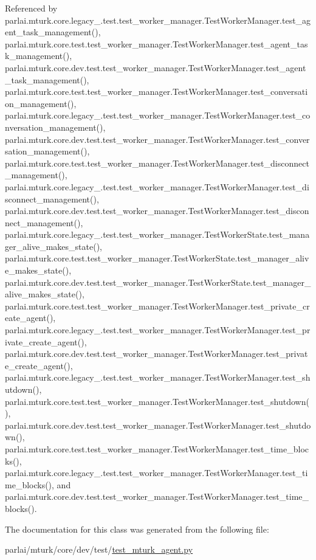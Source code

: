 Referenced by parlai.\+mturk.\+core.\+legacy\+\_.\+test.\+test\+\_\+worker\+\_\+manager.\+Test\+Worker\+Manager.\+test\+\_\+agent\+\_\+task\+\_\+management(), parlai.\+mturk.\+core.\+test.\+test\+\_\+worker\+\_\+manager.\+Test\+Worker\+Manager.\+test\+\_\+agent\+\_\+task\+\_\+management(), parlai.\+mturk.\+core.\+dev.\+test.\+test\+\_\+worker\+\_\+manager.\+Test\+Worker\+Manager.\+test\+\_\+agent\+\_\+task\+\_\+management(), parlai.\+mturk.\+core.\+test.\+test\+\_\+worker\+\_\+manager.\+Test\+Worker\+Manager.\+test\+\_\+conversation\+\_\+management(), parlai.\+mturk.\+core.\+legacy\+\_.\+test.\+test\+\_\+worker\+\_\+manager.\+Test\+Worker\+Manager.\+test\+\_\+conversation\+\_\+management(), parlai.\+mturk.\+core.\+dev.\+test.\+test\+\_\+worker\+\_\+manager.\+Test\+Worker\+Manager.\+test\+\_\+conversation\+\_\+management(), parlai.\+mturk.\+core.\+test.\+test\+\_\+worker\+\_\+manager.\+Test\+Worker\+Manager.\+test\+\_\+disconnect\+\_\+management(), parlai.\+mturk.\+core.\+legacy\+\_.\+test.\+test\+\_\+worker\+\_\+manager.\+Test\+Worker\+Manager.\+test\+\_\+disconnect\+\_\+management(), parlai.\+mturk.\+core.\+dev.\+test.\+test\+\_\+worker\+\_\+manager.\+Test\+Worker\+Manager.\+test\+\_\+disconnect\+\_\+management(), parlai.\+mturk.\+core.\+legacy\+\_.\+test.\+test\+\_\+worker\+\_\+manager.\+Test\+Worker\+State.\+test\+\_\+manager\+\_\+alive\+\_\+makes\+\_\+state(), parlai.\+mturk.\+core.\+test.\+test\+\_\+worker\+\_\+manager.\+Test\+Worker\+State.\+test\+\_\+manager\+\_\+alive\+\_\+makes\+\_\+state(), parlai.\+mturk.\+core.\+dev.\+test.\+test\+\_\+worker\+\_\+manager.\+Test\+Worker\+State.\+test\+\_\+manager\+\_\+alive\+\_\+makes\+\_\+state(), parlai.\+mturk.\+core.\+test.\+test\+\_\+worker\+\_\+manager.\+Test\+Worker\+Manager.\+test\+\_\+private\+\_\+create\+\_\+agent(), parlai.\+mturk.\+core.\+legacy\+\_.\+test.\+test\+\_\+worker\+\_\+manager.\+Test\+Worker\+Manager.\+test\+\_\+private\+\_\+create\+\_\+agent(), parlai.\+mturk.\+core.\+dev.\+test.\+test\+\_\+worker\+\_\+manager.\+Test\+Worker\+Manager.\+test\+\_\+private\+\_\+create\+\_\+agent(), parlai.\+mturk.\+core.\+legacy\+\_.\+test.\+test\+\_\+worker\+\_\+manager.\+Test\+Worker\+Manager.\+test\+\_\+shutdown(), parlai.\+mturk.\+core.\+test.\+test\+\_\+worker\+\_\+manager.\+Test\+Worker\+Manager.\+test\+\_\+shutdown(), parlai.\+mturk.\+core.\+dev.\+test.\+test\+\_\+worker\+\_\+manager.\+Test\+Worker\+Manager.\+test\+\_\+shutdown(), parlai.\+mturk.\+core.\+test.\+test\+\_\+worker\+\_\+manager.\+Test\+Worker\+Manager.\+test\+\_\+time\+\_\+blocks(), parlai.\+mturk.\+core.\+legacy\+\_.\+test.\+test\+\_\+worker\+\_\+manager.\+Test\+Worker\+Manager.\+test\+\_\+time\+\_\+blocks(), and parlai.\+mturk.\+core.\+dev.\+test.\+test\+\_\+worker\+\_\+manager.\+Test\+Worker\+Manager.\+test\+\_\+time\+\_\+blocks().



The documentation for this class was generated from the following file\+:\begin{DoxyCompactItemize}
\item 
parlai/mturk/core/dev/test/\hyperlink{dev_2test_2test__mturk__agent_8py}{test\+\_\+mturk\+\_\+agent.\+py}\end{DoxyCompactItemize}
